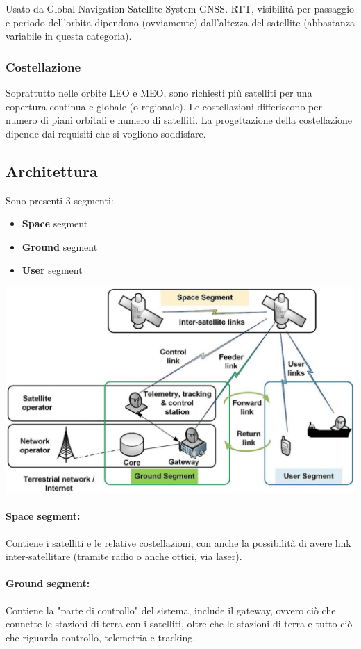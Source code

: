 Usato da Global Navigation Satellite System GNSS. RTT, visibilità per passaggio e periodo dell'orbita dipendono (ovviamente) dall'altezza del satellite (abbastanza variabile in questa categoria).


\subsubsection{Costellazione}

Soprattutto nelle orbite LEO e MEO, sono richiesti più satelliti per una copertura continua e globale (o regionale). Le costellazioni differiscono per numero di piani orbitali e numero di satelliti. La progettazione della costellazione dipende dai requisiti che si vogliono soddisfare.

\subsection{Architettura}
Sono presenti 3 segmenti:
\begin{itemize}
	\item \textbf{Space} segment
	\item \textbf{Ground} segment
	\item \textbf{User} segment
\end{itemize}

\begin{center}
	\includegraphics[width=0.7\linewidth]{img/sat/arch}
\end{center}

\paragraph{Space segment:} Contiene i satelliti e le relative costellazioni, con anche la possibilità di avere link inter-satellitare (tramite radio o anche ottici, via laser).

\paragraph{Ground segment:} Contiene la "parte di controllo" del sistema, include il gateway, ovvero ciò che connette le stazioni di terra con i satelliti, oltre che le stazioni di terra e tutto ciò che riguarda controllo, telemetria e tracking.

